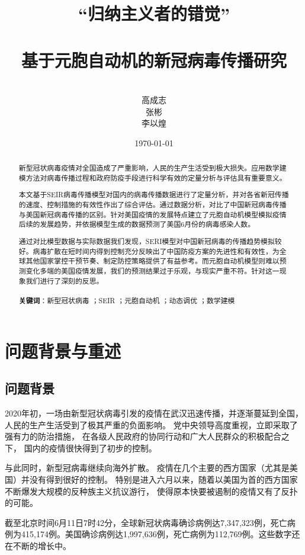 \documentclass[UTF8]{ctexart}
\title{“归纳主义者的错觉” \\ \hspace*{\fill} \\ 基于元胞自动机的新冠病毒传播研究}
\author{\\高成志\\ 张彬 \\李以煌}
\date{\today}
\begin{document}
\maketitle

\newpage
\begin{abstract}
    \par 
    新型冠状病毒疫情对全国造成了严重影响，人民的生产生活受到极大损失。应用数学建模方法对病毒传播过程和政府防疫手段进行科学有效的定量分析与评估具有重要意义。
    \par 
    本文基于SEIR病毒传播模型对国内的病毒传播数据进行了定量分析，并对各省新冠传播的速度、控制措施的有效性作出了综合评估。通过数据分析，对比了中国新冠病毒传播与美国新冠病毒传播的区别。针对美国疫情的发展特点建立了元胞自动机模型模拟疫情后续的发展趋势，并依据模型生成的数据预测了美国6月份的病毒感染人数。
    \par 
    通过对比模型数据与实际数据我们发现，SERI模型对中国新冠病毒的传播趋势模拟较好。病毒扩散在短时间内得到控制充分反映出了中国防疫方案的先进性和有效性，为全球其他国家掌控干预节奏、制定防控策略提供了有益参考。而元胞自动机模型则难以预测变化多端的美国疫情发展，我们的预测结果过于乐观，与现实严重不符。针对这一现象我们进行了深刻的反思。
    \\ \hspace*{\fill} \\  
    \textbf{关键词}：新型冠状病毒 ；SEIR ；元胞自动机 ；动态调优 ；数学建模
\end{abstract}
\newpage

\tableofcontents

\newpage
\section{问题背景与重述}
\subsection{问题背景} %
\label{sub:问题背景}
2020年初，一场由新型冠状病毒引发的疫情在武汉迅速传播，并逐渐蔓延到全国，
人民的生产生活受到了极其严重的负面影响。
党中央领导高度重视，立即采取了强有力的防治措施，
在各级人民政府的协同行动和广大人民群众的积极配合之下，
国内的疫情很快得到了初步的控制。
\par
与此同时，新型冠病毒继续向海外扩散。
疫情在几个主要的西方国家（尤其是美国）并没有得到很好的控制。
特别是进入六月以来，随着以美国为首的西方国家不断爆发大规模的反种族主义抗议游行，
使得原本快要被遏制的疫情又有了反扑的可能。
\par
截至北京时间6月11日7时42分，全球新冠状病毒确诊病例达7,347,323例，死亡病例为415,174例。美国确诊病例达1,997,636例，死亡病例为112,769例。这些数字还在不断的增长中。
\end{document}
